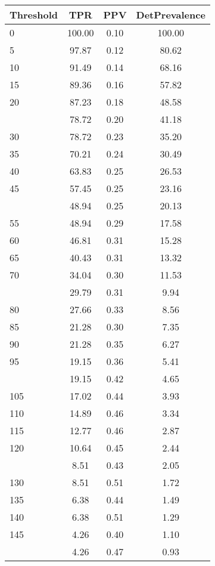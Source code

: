 \begin{table}[ht]
\centering
\begin{tabular}{lccc}
  \toprule
Threshold & TPR & PPV & DetPrevalence \\ 
  \midrule
0 & 100.00 & 0.10 & 100.00 \\ 
  5 & 97.87 & 0.12 & 80.62 \\ 
  10 & 91.49 & 0.14 & 68.16 \\ 
  15 & 89.36 & 0.16 & 57.82 \\ 
  20 & 87.23 & 0.18 & 48.58 \\ 
   \addlinespace
25 & 78.72 & 0.20 & 41.18 \\ 
  30 & 78.72 & 0.23 & 35.20 \\ 
  35 & 70.21 & 0.24 & 30.49 \\ 
  40 & 63.83 & 0.25 & 26.53 \\ 
  45 & 57.45 & 0.25 & 23.16 \\ 
   \addlinespace
50 & 48.94 & 0.25 & 20.13 \\ 
  55 & 48.94 & 0.29 & 17.58 \\ 
  60 & 46.81 & 0.31 & 15.28 \\ 
  65 & 40.43 & 0.31 & 13.32 \\ 
  70 & 34.04 & 0.30 & 11.53 \\ 
   \addlinespace
75 & 29.79 & 0.31 & 9.94 \\ 
  80 & 27.66 & 0.33 & 8.56 \\ 
  85 & 21.28 & 0.30 & 7.35 \\ 
  90 & 21.28 & 0.35 & 6.27 \\ 
  95 & 19.15 & 0.36 & 5.41 \\ 
   \addlinespace
100 & 19.15 & 0.42 & 4.65 \\ 
  105 & 17.02 & 0.44 & 3.93 \\ 
  110 & 14.89 & 0.46 & 3.34 \\ 
  115 & 12.77 & 0.46 & 2.87 \\ 
  120 & 10.64 & 0.45 & 2.44 \\ 
   \addlinespace
125 & 8.51 & 0.43 & 2.05 \\ 
  130 & 8.51 & 0.51 & 1.72 \\ 
  135 & 6.38 & 0.44 & 1.49 \\ 
  140 & 6.38 & 0.51 & 1.29 \\ 
  145 & 4.26 & 0.40 & 1.10 \\ 
   \addlinespace
150 & 4.26 & 0.47 & 0.93 \\ 

\end{tabular}
\end{table}
